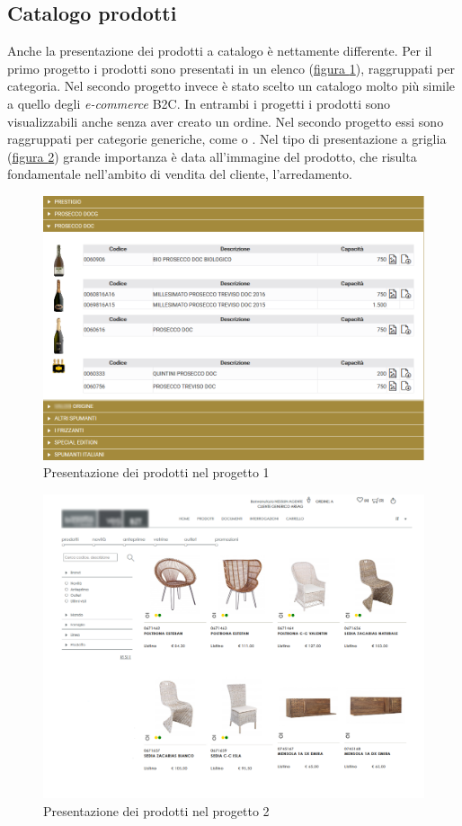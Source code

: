 \subsection{Catalogo prodotti}
Anche la presentazione dei prodotti a catalogo è nettamente differente. Per il primo progetto i prodotti sono presentati in un elenco (\hyperref[fig:catalogo-1]{figura \ref{fig:catalogo-1}}), raggruppati per categoria. Nel secondo progetto invece è stato scelto un catalogo molto più simile a quello degli \textit{e-commerce} B2C. In entrambi i progetti i prodotti sono visualizzabili anche senza aver creato un ordine. Nel secondo progetto essi sono raggruppati per categorie generiche, come  o . Nel tipo di presentazione a griglia (\hyperref[fig:catalogo-2]{figura \ref{fig:catalogo-2}}) grande importanza è data all'immagine del prodotto, che risulta fondamentale nell'ambito di vendita del cliente, l'arredamento.
\begin{figure}[H]
	\centering
	\includegraphics[width=\linewidth]{Immagini/p1/catalogo.png}
	\caption{Presentazione dei prodotti nel progetto 1}
	\label{fig:catalogo-1}
\end{figure}
\begin{figure}[H]
	\centering
	\includegraphics[width=\linewidth]{Immagini/p2/catalogo.png}
	\caption{Presentazione dei prodotti nel progetto 2}
	\label{fig:catalogo-2}
\end{figure}

